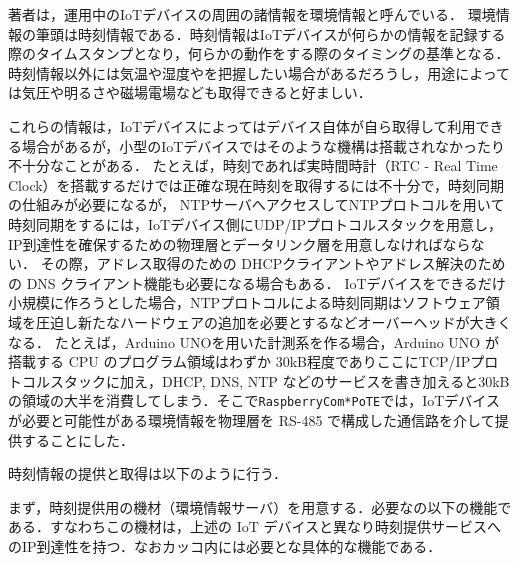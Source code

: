 著者は，運用中のIoTデバイスの周囲の諸情報を環境情報と呼んでいる．
環境情報の筆頭は時刻情報である．時刻情報はIoTデバイスが何らかの情報を記録する際のタイムスタンプとなり，何らかの動作をする際のタイミングの基準となる．
時刻情報以外には気温や湿度やを把握したい場合があるだろうし，用途によっては気圧や明るさや磁場電場なども取得できると好ましい．

これらの情報は，IoTデバイスによってはデバイス自体が自ら取得して利用できる場合があるが，小型のIoTデバイスではそのような機構は搭載されなかったり不十分なことがある．
たとえば，時刻であれば実時間時計（RTC - Real Time Clock）を搭載するだけでは正確な現在時刻を取得するには不十分で，時刻同期の仕組みが必要になるが，
NTPサーバへアクセスしてNTPプロトコルを用いて時刻同期をするには，IoTデバイス側にUDP/IPプロトコルスタックを用意し，IP到達性を確保するための物理層とデータリンク層を用意しなければならない．
その際，アドレス取得のための DHCPクライアントやアドレス解決のための DNS クライアント機能も必要になる場合もある．
IoTデバイスをできるだけ小規模に作ろうとした場合，NTPプロトコルによる時刻同期はソフトウェア領域を圧迫し新たなハードウェアの追加を必要とするなどオーバーヘッドが大きくなる．
たとえば，Arduino UNO\cite{data:Arduino}を用いた計測系を作る場合，Arduino UNO が搭載する CPU のプログラム領域はわずか 30kB程度でありここにTCP/IPプロトコルスタックに加え，DHCP, DNS, NTP などのサービスを書き加えると30kBの領域の大半を消費してしまう．そこで{\tt Raspberry\-Com*PoTE}では，IoTデバイスが必要と可能性がある環境情報を物理層を RS-485 で構成した通信路を介して提供することにした．
\\



{} \par

時刻情報の提供と取得は以下のように行う．

まず，時刻提供用の機材（環境情報サーバ）を用意する．必要なの以下の機能である．すなわちこの機材は，上述の IoT デバイスと異なり時刻提供サービスへのIP到達性を持つ．なおカッコ内には必要とな具体的な機能である．

